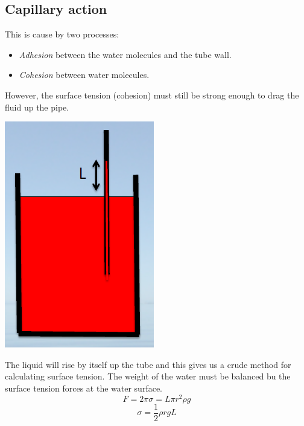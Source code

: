 \documentclass[class=report, crop=false, 12pt,a4paper]{standalone}
\begin{document}
\subsection{Capillary action}
This is cause by two processes:
\begin{itemize}[noitemsep]
  \item \emph{Adhesion} between the water molecules and the tube wall.
  \item \emph{Cohesion} between water molecules.
\end{itemize}
However, the surface tension (cohesion) must still be strong enough to drag the fluid up the pipe.
\begin{center}
  \includegraphics[width = 0.4 \textwidth]{../img/CapillaryAction}
\end{center}
The liquid will rise by itself up the tube and this gives us a crude method for calculating surface tension. The weight of the water must be balanced bu the surface tension forces at the water surface.
\begin{equation}
  F = 2\pi \sigma = L\pi r^2 \rho g
\end{equation}
\begin{equation}
  \sigma = \frac{1}{2}\rho r g L
\end{equation}
\end{document}
